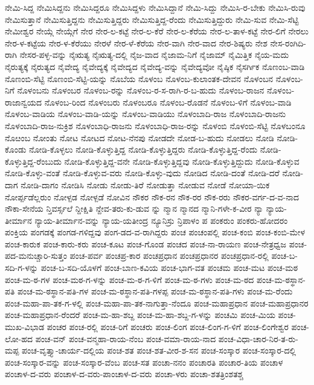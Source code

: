 ನೇಮಿ-ಸಿದ್ದ
ನೇಮಿಸಿದ್ದನು
ನೇಮಿಸಿದ್ದರೂ
ನೇಮಿಸಿದ್ದಳು
ನೇಮಿಸಿದ್ದಾನೆ
ನೇಮಿ-ಸಿದ್ದು
ನೇಮಿಸಿ-ರ-ಬೇಕು
ನೇಮಿಸಿ-ರುವು
ನೇಮಿಸುತ್ತಾನೆ
ನೇಮಿಸುತ್ತಿದ್ದನು
ನೇಮಿಸುತ್ತಿದ್ದರು
ನೇಮಿಸುತ್ತಿದ್ದ-ರೆಂದು
ನೇಮಿಸುತ್ತಿದ್ದುರು
ನೇಮಿ-ಸುವ
ನೇಮಿ-ಸೆಟ್ಟಿ
ನೇಮೀಶ್ವರ
ನೇಯ್ಗೆ
ನೇಯ್ಗೆಗೆ
ನೇರ
ನೇರ-ಲ-ಕಟ್ಟೆ
ನೇರ-ಲ-ಕೆರೆ
ನೇರ-ಲ-ಕೆರೆಯ
ನೇರ-ಲ-ತಾಳ-ಕಟ್ಟೆ
ನೇರ-ಲಿಗೆ
ನೇರಲು
ನೇರ-ಳ-ಕಟ್ಟೆಯ
ನೇರ-ಳ-ಕೆರೆಯು
ನೇರಳೆ
ನೇರ-ಳೆ-ಕೆರೆಯ
ನೇರ-ವಾಗಿ
ನೇರ-ವಾದ
ನೇರ-ಶಿಷ್ಯರು
ನೇಶ
ನೇಸ-ರಂಗಿದಿ-ರಾಗಿ
ನೇಸರ-ಪಳ್ಳ-ವನ್ನು
ನೈಋತ್ಯ
ನೈಋತ್ಯ-ದಲ್ಲಿ
ನೈಜ-ವಾದ
ನೈಜಾಮ-ನಿಗೆ
ನೈಜಾಮ್
ನೈಮಿತ್ತಿಕ
ನೈಯ-ಮದು
ನೈರುತ್ಯಕ್ಕೆ
ನೈರುತ್ಯದ
ನೈವೇದ್ಯ
ನೈವೇದ್ಯಕ್ಕೆ
ನೈವೇದ್ಯದ
ನೈವೇದ್ಯ-ವನ್ನು
ನೈವೇದ್ಯವೋ
ನೈಷ್ಠಿಕ
ನೈಸರ್ಗಿಕ
ನೊಣಂಬ-ವಾಡಿ
ನೊಣಂಬಿ-ಸೆಟ್ಟಿ
ನೊಣಂಬಿ-ಸೆಟ್ಟಿ-ಯನ್ನು
ನೊಬೆಯ
ನೊಳಂಬ
ನೊಳಂಬ-ಕುಲಾಂತಕ-ದೇವನ
ನೊಳಂಬನ
ನೊಳಂಬ-ನಿಗೆ
ನೊಳಂಬನು
ನೊಳಂಬರ
ನೊಳಂಬ-ರನ್ನು
ನೊಳಂಬ-ರ-ಸ-ರಾಗಿ-ರ-ಬ-ಹುದು
ನೊಳಂಬ-ರಾಜನ
ನೊಳಂಬ-ರಾಜಾನ್ವಯದ
ನೊಳಂಬ-ರಿಂದ
ನೊಳಂಬರು
ನೊಳಂಬರೂ
ನೊಳಂಬ-ರೊಡನೆ
ನೊಳಂಬ-ಳಿಗೆ
ನೊಳಂಬ-ವಾಡಿ
ನೊಳಂಬ-ವಾಡಿಯ
ನೊಳಂಬ-ವಾಡಿ-ಯನ್ನು
ನೊಳಂಬ-ವಾಡಿಯು
ನೊಳಂಬಾದಿ-ರಾಜ
ನೊಳಂಬಾದಿ-ರಾಜನು
ನೊಳಂಬಾದಿ-ರಾಜ-ನುಕ್ರಿಶ
ನೊಳಂಬಾಧಿ-ರಾಜನು
ನೊಳಂಬಾಧಿ-ರಾಜ-ರನ್ನು
ನೊಳಂಬಿ
ನೊಳಂಬಿ-ಸೆಟ್ಟಿ
ನೊಳಬಂನೂ
ನೊೞಂಬ
ನೋಂತು
ನೋಟ
ನೋಟದ
ನೋಟ-ನೆನಪು
ನೋಡದೇ
ನೋಡ-ಬ-ಹುದು
ನೋಡಲು
ನೋಡಿ
ನೋಡಿ-ಕೊಂಡು
ನೋಡಿ-ಕೊಳ್ಳಲು
ನೋಡಿ-ಕೊಳ್ಳುತ್ತಿದ್ದ
ನೋಡಿ-ಕೊಳ್ಳುತ್ತಿದ್ದರು
ನೋಡಿ-ಕೊಳ್ಳುತ್ತಿದ್ದ-ರೆಂದು
ನೋಡಿ-ಕೊಳ್ಳುತ್ತಿದ್ದ-ರೆಂಬುದು
ನೋಡಿ-ಕೊಳ್ಳುತ್ತಿದ್ದ-ವನೇ
ನೋಡಿ-ಕೊಳ್ಳುತ್ತಿದ್ದವು
ನೋಡಿ-ಕೊಳ್ಳುತ್ತಿದ್ದುದು
ನೋಡಿ-ಕೊಳ್ಳುವ
ನೋಡಿ-ಕೊಳ್ಳು-ವಂತೆ
ನೋಡಿ-ಕೊಳ್ಳುವ-ವರು
ನೋಡಿ-ಕೊಳ್ಳು-ವುದು
ನೋಡಿದ
ನೋಡಿ-ದಂತೆ
ನೋಡಿ-ದರೆ
ನೋಡಿ-ದಾಗ
ನೋಡಿ-ದಾಗಂ
ನೋಡಿಸಿ
ನೋಡು
ನೋಡು-ತಿರೆ
ನೋಡುತ್ತಾ
ನೋಡುವ
ನೋಡೆ
ನೋಯಾ-ಯಿಕ
ನೋರ್ಪ್ಪಡೆಲ್ಲರುಂ
ನೋಳ್ಪಡ
ನೋಳ್ಪಡೆ
ನೋವಿನ
ನೌಕರ
ನೌಕ-ರನ
ನೌಕ-ರರ
ನೌಕ-ರರು
ನೌಕರ-ವರ್ಗ-ದ-ವ-ನಾದ
ನೌಕಾ-ಸೇನೆಯ
ನ್ತಿವರ್ಸ್ಸಲೆ
ನ್ದೀಕ್ಷಿತಿ
ನ್ದೇವ-ತರು-ಕು-ಡುವ
ನ್ನು
ನ್ಮಾನ
ನ್ಮಾನದ
ನ್ಮಾನಿ-ಗಳೇ-ಕ-ವೀರ
ನ್ಯಾ
ನ್ಯಾಯ-ತೀರ್ಮಾನ
ನ್ಯಾಯ-ತೀರ್ಮಾನ-ವನ್ನು
ನ್ಯಾಯ-ಯತೀಂದ್ರ
ನ್ಯೂನಿಸ್ರು
ನ್ರಿಪಾಳಂ
ಪ
ಪಂಕರುಂ
ಪಂಕರು-ಹೋದರಂ
ಪಂಕ್ತಿಯ
ಪಂಗಡಕ್ಕೆ
ಪಂಗಡ-ಗಳಿದ್ದವು
ಪಂಗ-ಡದ-ವ-ರಾಗಿದ್ದರು
ಪಂಚ
ಪಂಚಂಪಲ್ಲಿ
ಪಂಚ-ಕಂಬಿ
ಪಂಚ-ಕಂಬಿ-ಮೇಳ
ಪಂಚ-ಕಾರುಕ
ಪಂಚ-ಕಾರು-ಕರು
ಪಂಚ-ಕೂಟ
ಪಂಚ-ಗೊಂಡ
ಪಂಚದ
ಪಂಚ-ನಾ-ರಾಯಣ
ಪಂಚ-ನೇತ್ರಧ್ವಜ
ಪಂಚ-ಪದ-ಮನುಚ್ಚಾರಿ-ಸುತ್ತಂ
ಪಂಚ-ಪರ್ವ
ಪಂಚಪ್ರ-ಕಾರ
ಪಂಚಪ್ರಧಾನ
ಪಂಚಪ್ರಧಾನರ
ಪಂಚಪ್ರಧಾನ-ರಲ್ಲಿ
ಪಂಚ-ಬ-ಸದಿ-ಗ-ಳನ್ನು
ಪಂಚ-ಬ-ಸದಿ-ಯೊಳಗೆ
ಪಂಚ-ಬಾಣ-ಕವಿಯ
ಪಂಚ-ಭಾಗ-ವತ
ಪಂಚಮ
ಪಂಚ-ಮಟ
ಪಂಚ-ಮಠ
ಪಂಚ-ಮ-ಠ-ಗಳ
ಪಂಚ-ಮಠ-ಗ-ಳನ್ನು
ಪಂಚ-ಮ-ಠ-ಗ-ಳಿಗೆ
ಪಂಚ-ಮ-ಠ-ಗಳು
ಪಂಚ-ಮ-ಠದ
ಪಂಚ-ಮ-ಠಸ್ಥಾನ-ಪತಿ
ಪಂಚ-ಮ-ಠಸ್ಥಾನ-ಪತಿ-ಗಳ
ಪಂಚ-ಮ-ಠಸ್ಥಾನ-ಪತಿ-ಗಳಪ್ಪ
ಪಂಚ-ಮ-ಠಸ್ಥಾನ-ಪತಿ-ಗಳು
ಪಂಚ-ಮ-ರೆಂದು
ಪಂಚ-ಮಹಾ-ಪಾ-ತಕ-ಗ-ಳಲ್ಲಿ
ಪಂಚ-ಮಹಾ-ಪಾ-ತಕ-ನಾಗುತ್ತಾ-ನೆಂದೂ
ಪಂಚ-ಮಹಾಪ್ರಧಾನ
ಪಂಚ-ಮಹಾಪ್ರಧಾನರ
ಪಂಚ-ಮಹಾಪ್ರಧಾನ-ರೆಂದರೆ
ಪಂಚ-ಮ-ಹಾ-ಶಬ್ದ
ಪಂಚ-ಮ-ಹಾ-ಶಬ್ದ-ಗ-ಳನ್ನು
ಪಂಚಮಿ
ಪಂಚ-ಮಿಯ
ಪಂಚ-ಮುಖ-ವಿಭಾಡ
ಪಂಚರ
ಪಂಚ-ರಲ್ಲಿ
ಪಂಚ-ರಿಗೆ
ಪಂಚರು
ಪಂಚ-ಲಿಂಗ
ಪಂಚ-ಲಿಂಗ-ಗ-ಳಿಗೆ
ಪಂಚ-ಲಿಂಗೇಶ್ವರ
ಪಂಚ-ಲೋ-ಹದ
ಪಂಚ-ವನ್
ಪಂಚ-ವನ್ಮಹಾ-ರಾಯ-ನೆಂಬ
ಪಂಚ-ವಮಾ-ರಾಯ-ನಾದ
ಪಂಚ-ವಿಧಾ-ಚಾರ-ನಿರ-ತ-ರು-ಮಪ್ಪ
ಪಂಚ-ವೃತ್ತ್ಯಾ-ಚಾರ್ಯ-ದಲ್ಲಿಯ
ಪಂಚ-ಶತ
ಪಂಚ-ಶತ-ವೀರ-ಶ-ಸನ
ಪಂಚ-ಸಂಸ್ಕಾರ
ಪಂಚ-ಸಂಸ್ಕಾರ-ದಲ್ಲಿ
ಪಂಚ-ಸಂಸ್ಕಾರ-ವನ್ನು
ಪಂಚ-ಸಂಸ್ಕಾರ-ವೆಂಬ
ಪಂಚ-ಸತ
ಪಂಚಾ-ನನಂ
ಪಂಚಾರತಿ
ಪಂಚಾರ-ತಿಯ
ಪಂಚಾಳ
ಪಂಚಾಳ-ದ-ವರು
ಪಂಚಾಳ-ದ-ವರು-ಪಾಂಚಾಳ-ದ-ವರು
ಪಂಚಾ-ಳರು
ಪಂಚಾ-ಶತತ್ರಿಂಶತಶ್ಚ
